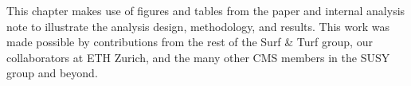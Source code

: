 



This chapter makes use of figures and tables from the \mttwo paper and internal analysis note to illustrate the analysis design, methodology, and results. This work was made possible by contributions from the rest of the Surf \& Turf group, our collaborators at ETH Zurich, and the many other CMS members in the SUSY group and beyond.

